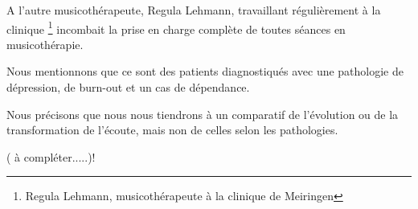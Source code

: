 A l'autre musicothérapeute, Regula Lehmann, travaillant régulièrement
à la clinique \footnote{Regula Lehmann, musicothérapeute à la clinique de Meiringen}
incombait la prise en charge complète de toutes séances en musicothérapie.

Nous mentionnons que ce sont des patients diagnostiqués avec une pathologie
de dépression, de burn-out et un cas de dépendance. 

Nous précisons que nous nous tiendrons à un comparatif de l'évolution
ou de la transformation de l'écoute, mais non de celles selon les
pathologies.

( à compléter.....)!

